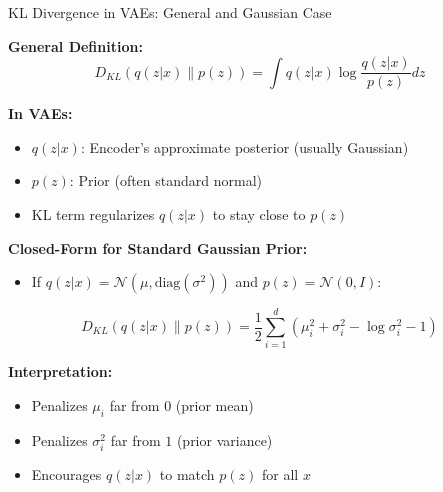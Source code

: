 \documentclass[5pt,aspectratio=169]{beamer}
\begin{document}
\begin{frame}{KL Divergence in VAEs: General and Gaussian Case}

\textbf{General Definition:}
\[
D_{KL}(q(z|x) \| p(z)) = \int q(z|x) \log \frac{q(z|x)}{p(z)} dz
\]

\vspace{2mm}
\textbf{In VAEs:}
\begin{itemize}
    \item $q(z|x)$: Encoder's approximate posterior (usually Gaussian)
    \item $p(z)$: Prior (often standard normal)
    \item KL term regularizes $q(z|x)$ to stay close to $p(z)$
\end{itemize}

\vspace{2mm}
\textbf{Closed-Form for Standard Gaussian Prior:}
\begin{itemize}
    \item If $q(z|x) = \mathcal{N}(\mu, \mathrm{diag}(\sigma^2))$ and $p(z) = \mathcal{N}(0, I)$:
\end{itemize}
\[
D_{KL}(q(z|x) \| p(z)) = \frac{1}{2} \sum_{i=1}^d \left( \mu_i^2 + \sigma_i^2 - \log \sigma_i^2 - 1 \right)
\]

\vspace{2mm}
\textbf{Interpretation:}
\begin{itemize}
    \item Penalizes $\mu_i$ far from $0$ (prior mean)
    \item Penalizes $\sigma_i^2$ far from $1$ (prior variance)
    \item Encourages $q(z|x)$ to match $p(z)$ for all $x$
\end{itemize}

\begin{center}
\end{center}

\end{frame}
\end{document}

